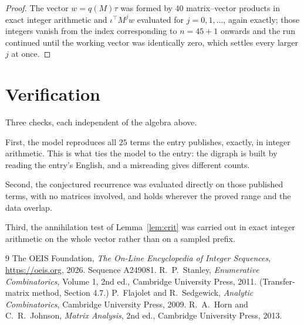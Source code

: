 \documentclass[11pt,a4paper]{article}
\theoremstyle{plain}
\theoremstyle{definition}
\begin{document}
\begin{proof}
The vector $w=q(M)\tau$ was formed by $40$ matrix--vector products in exact integer
arithmetic and $\iota^{\!\top}M^{j}w$ evaluated for $j=0,1,\dots$, again exactly; those
integers vanish from the index corresponding to $n=45+1$ onwards and the run continued
until the working vector was identically zero, which settles every larger $j$ at once.
\end{proof}

\section{Verification}

Three checks, each independent of the algebra above.

First, the model reproduces all $25$ terms the entry publishes, exactly, in integer
arithmetic. This is what ties the model to the entry: the digraph is built by reading the
entry's English, and a misreading gives different counts.

Second, the conjectured recurrence was evaluated directly on those published terms, with no
matrices involved, and holds wherever the proved range and the data overlap.

Third, the annihilation test of Lemma~\ref{lem:crit} was carried out in exact integer
arithmetic on the whole vector rather than on a sampled prefix.

\begin{thebibliography}{9}
 The OEIS Foundation, \emph{The On-Line Encyclopedia of Integer
Sequences}, \url{https://oeis.org}, 2026. Sequence A249081.
 R.~P.~Stanley, \emph{Enumerative Combinatorics}, Volume 1, 2nd ed.,
Cambridge University Press, 2011. (Transfer-matrix method, Section 4.7.)
 P.~Flajolet and R.~Sedgewick, \emph{Analytic Combinatorics}, Cambridge
University Press, 2009.
 R.~A.~Horn and C.~R.~Johnson, \emph{Matrix Analysis}, 2nd ed., Cambridge
University Press, 2013.
\end{thebibliography}
\end{document}
